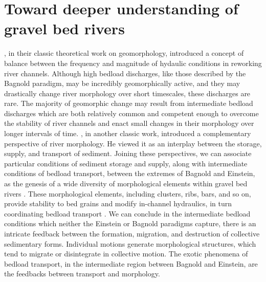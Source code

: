 \documentclass{article}
\begin{document}

\section{Toward deeper understanding of gravel bed rivers} 



\citet{Wolman1960}, in their classic theoretical work on geomorphology, introduced a concept of balance between the frequency and magnitude of hydaulic conditions in reworking river channels.  
Although high bedload discharges, like those described by the Bagnold paradigm, may be incredibly geomorphically active, and they may drastically change river morphology over short timescales, these discharges are rare. 
The majority of geomorphic change may result from intermediate bedload discharges which are both relatively common and competent enough to overcome the stability of river channels and enact small changes in their morphology over longer intervals of time.  
\citet{Shumm1960}, in another classic work, introduced a complementary perspective of river morphology. 
He viewed it as an interplay between the storage, supply, and transport of sediment. 
Joining these perspectives, we can associate particular conditions of sediment storage and supply, along with intermediate conditions of bedload transport, between the extremes of Bagnold and Einstein, as the genesis of a wide diversity of morphological elements within gravel bed rivers \citep{Brayshaw1984, Church1998, Hassan2008, Nelson2014, Venditti2017}.
These morphological elements, including clusters, ribs, bars, and so on, provide stability to bed grains and modify in-channel hydraulics, in turn coordinating bedload transport \citep{Laronne1976, Lisle1992, Wilcock2003a, Kasprak2014, Recking2016, Hassan2017}. 
We can conclude in the intermediate bedload conditions which neither the Einstein or Bagnold paradigms capture, there is an intricate feedback between the formation, migration, and destruction of collective sedimentary forms.
Individual motions generate morphological structures, which tend to migrate or disintegrate in collective motion.  
The exotic phenomena of bedload transport, in the intermediate region between Bagnold and Einstein, are the feedbacks between transport and morphology.   
\end{document}
